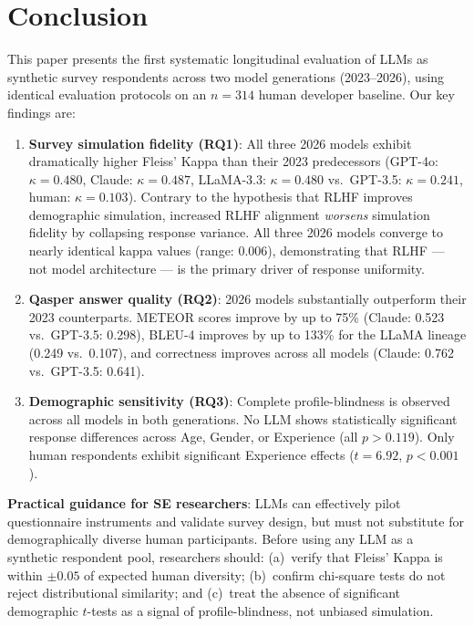 \documentclass[11pt,a4paper]{article}
\begin{document}
\section{Conclusion}
\label{sec:conclusion}

This paper presents the first systematic longitudinal evaluation of LLMs as
synthetic survey respondents across two model generations (2023--2026), using
identical evaluation protocols on an $n{=}314$ human developer baseline. Our
key findings are:

\begin{enumerate}
  \item \textbf{Survey simulation fidelity (RQ1)}: All three 2026 models exhibit
    dramatically higher Fleiss' Kappa than their 2023 predecessors (GPT-4o:
    $\kappa{=}0.480$, Claude: $\kappa{=}0.487$, LLaMA-3.3: $\kappa{=}0.480$
    vs.\ GPT-3.5: $\kappa{=}0.241$, human: $\kappa{=}0.103$). Contrary to the
    hypothesis that RLHF improves demographic simulation, increased RLHF
    alignment \emph{worsens} simulation fidelity by collapsing response
    variance. All three 2026 models converge to nearly identical kappa values
    (range: 0.006), demonstrating that RLHF --- not model architecture ---
    is the primary driver of response uniformity.

  \item \textbf{Qasper answer quality (RQ2)}: 2026 models substantially
    outperform their 2023 counterparts. METEOR scores improve by up to 75\%
    (Claude: 0.523 vs.\ GPT-3.5: 0.298), BLEU-4 improves by up to 133\%
    for the LLaMA lineage (0.249 vs.\ 0.107), and correctness improves across
    all models (Claude: 0.762 vs.\ GPT-3.5: 0.641).

  \item \textbf{Demographic sensitivity (RQ3)}: Complete profile-blindness is
    observed across all models in both generations. No LLM shows statistically
    significant response differences across Age, Gender, or Experience (all
    $p > 0.119$). Only human respondents exhibit significant Experience effects
    ($t{=}6.92$, $p{<}0.001$).
\end{enumerate}

\medskip
\noindent\textbf{Practical guidance for SE researchers}: LLMs can effectively
pilot questionnaire instruments and validate survey design, but must not
substitute for demographically diverse human participants. Before using any LLM
as a synthetic respondent pool, researchers should: (a)~verify that Fleiss'
Kappa is within $\pm 0.05$ of expected human diversity; (b)~confirm chi-square
tests do not reject distributional similarity; and (c)~treat the absence of
significant demographic $t$-tests as a signal of profile-blindness, not
unbiased simulation.
\end{document}
